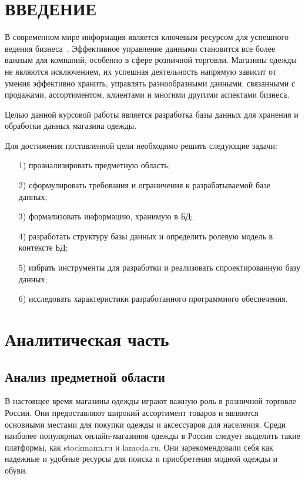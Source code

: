 \documentclass{bmstu}
\begin{document}
{\centering \chapter*{ВВЕДЕНИЕ}}

В современном мире информация является ключевым ресурсом для успешного ведения бизнеса~\cite{Business}. Эффективное управление данными становится все более важным для компаний, особенно в сфере розничной торговли. Магазины одежды не являются исключением, их успешная деятельность напрямую зависит от умения эффективно хранить, управлять разнообразными данными, связанными с продажами, ассортиментом, клиентами и многими другими аспектами бизнеса.

Целью данной курсовой работы является разработка базы данных для хранения и обработки данных магазина одежды.

Для достижения поставленной цели необходимо решить следующие задачи:
\begin{enumerate}
\item[1)] проанализировать предметную область;
\item[2)] сформулировать требования и ограничения к разрабатываемой базе данных;
\item[3)] формализовать информацию, хранимую в БД;
\item[4)] разработать структуру базы данных и определить ролевую модель в контексте БД;
\item[5)] избрать инструменты для разработки и реализовать спроектированную базу данных;
\item[6)] исследовать характеристики разработанного программного обеспечения.
\end{enumerate}

\chapter{Аналитическая часть}

\section{Анализ предметной области}

В настоящее время магазины одежды играют важную роль в розничной торговле России. Они предоставляют широкий ассортимент товаров и являются основными местами для покупки одежды и аксессуаров для населения. Среди наиболее популярных онлайн-магазинов одежды в России следует выделить такие платформы, как stockmann.ru и lamoda.ru. Они зарекомендовали себя как надежные и удобные ресурсы для поиска и приобретения модной одежды и обуви.
\end{document}

